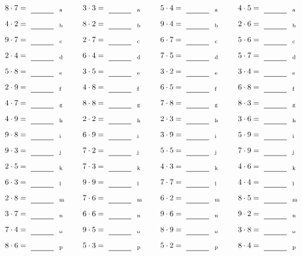 \documentclass
[
  draft    = true,
  fontsize = 11pt,
  parskip  = half-
]
{scrartcl}
\begin{document}
\par\vfill\par
\begin{align*}
    \pline{8\cdot7}&=\rline{a}
  & \pline{3\cdot3}&=\rline{a}
  & \pline{5\cdot4}&=\rline{a}
  & \pline{4\cdot5}&=\rline{a} \\[1ex]
    \pline{4\cdot2}&=\rline{b}
  & \pline{8\cdot2}&=\rline{b}
  & \pline{9\cdot4}&=\rline{b}
  & \pline{2\cdot6}&=\rline{b} \\[1ex]
    \pline{9\cdot7}&=\rline{c}
  & \pline{2\cdot7}&=\rline{c}
  & \pline{6\cdot7}&=\rline{c}
  & \pline{5\cdot6}&=\rline{c} \\[1ex]
    \pline{2\cdot4}&=\rline{d}
  & \pline{6\cdot4}&=\rline{d}
  & \pline{7\cdot5}&=\rline{d}
  & \pline{5\cdot7}&=\rline{d} \\[1ex]
    \pline{5\cdot8}&=\rline{e}
  & \pline{3\cdot5}&=\rline{e}
  & \pline{3\cdot2}&=\rline{e}
  & \pline{3\cdot4}&=\rline{e} \\[1ex]
    \pline{2\cdot9}&=\rline{f}
  & \pline{4\cdot8}&=\rline{f}
  & \pline{6\cdot5}&=\rline{f}
  & \pline{6\cdot8}&=\rline{f} \\[1ex]
    \pline{4\cdot7}&=\rline{g}
  & \pline{8\cdot8}&=\rline{g}
  & \pline{7\cdot8}&=\rline{g}
  & \pline{8\cdot3}&=\rline{g} \\[1ex]
    \pline{4\cdot9}&=\rline{h}
  & \pline{2\cdot2}&=\rline{h}
  & \pline{2\cdot3}&=\rline{h}
  & \pline{3\cdot6}&=\rline{h} \\[1ex]
    \pline{9\cdot8}&=\rline{i}
  & \pline{6\cdot9}&=\rline{i}
  & \pline{3\cdot9}&=\rline{i}
  & \pline{5\cdot9}&=\rline{i} \\[1ex]
    \pline{9\cdot3}&=\rline{j}
  & \pline{7\cdot2}&=\rline{j}
  & \pline{5\cdot5}&=\rline{j}
  & \pline{7\cdot9}&=\rline{j} \\[1ex]
    \pline{2\cdot5}&=\rline{k}
  & \pline{7\cdot3}&=\rline{k}
  & \pline{4\cdot3}&=\rline{k}
  & \pline{4\cdot6}&=\rline{k} \\[1ex]
    \pline{6\cdot3}&=\rline{l}
  & \pline{9\cdot9}&=\rline{l}
  & \pline{7\cdot7}&=\rline{l}
  & \pline{4\cdot4}&=\rline{l} \\[1ex]
    \pline{2\cdot8}&=\rline{m}
  & \pline{7\cdot6}&=\rline{m}
  & \pline{6\cdot2}&=\rline{m}
  & \pline{8\cdot5}&=\rline{m} \\[1ex]
    \pline{3\cdot7}&=\rline{n}
  & \pline{6\cdot6}&=\rline{n}
  & \pline{9\cdot6}&=\rline{n}
  & \pline{9\cdot2}&=\rline{n} \\[1ex]
    \pline{7\cdot4}&=\rline{o}
  & \pline{9\cdot5}&=\rline{o}
  & \pline{8\cdot9}&=\rline{o}
  & \pline{3\cdot8}&=\rline{o} \\[1ex]
    \pline{8\cdot6}&=\rline{p}
  & \pline{5\cdot3}&=\rline{p}
  & \pline{5\cdot2}&=\rline{p}
  & \pline{8\cdot4}&=\rline{p}
\end{align*}
\end{document}

